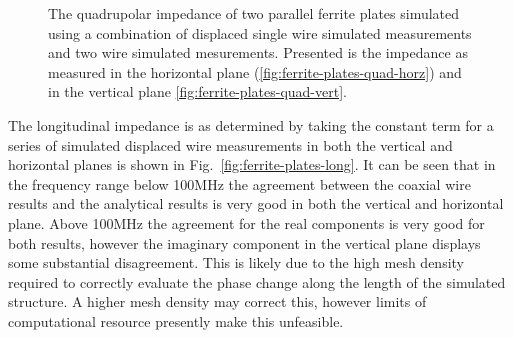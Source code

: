 \begin{figure}
\caption{The quadrupolar impedance of two parallel ferrite plates simulated using a combination of displaced single wire simulated measurements and two wire simulated mesurements. Presented is the impedance as measured in the horizontal plane (\ref{fig:ferrite-plates-quad-horz}) and in the vertical plane \ref{fig:ferrite-plates-quad-vert}.}
\label{fig:ferrite-plates-quadrupolar}
\end{figure}

The longitudinal impedance is as determined by taking the constant term for a series of simulated displaced wire measurements in both the vertical and horizontal planes is shown in Fig.~\ref{fig:ferrite-plates-long}. It can be seen that in the frequency range below 100MHz the agreement between the coaxial wire results and the analytical results is very good in both the vertical and horizontal plane. Above 100MHz the agreement for the real components is very good for both results, however the imaginary component in the vertical plane displays some substantial disagreement. This is likely due to the high mesh density required to correctly evaluate the phase change along the length of the simulated structure. A higher mesh density may correct this, however limits of computational resource presently make this unfeasible.

